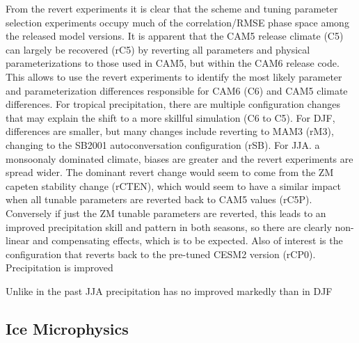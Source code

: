 From the revert experiments it is clear that the scheme and tuning parameter selection experiments occupy much of the correlation/RMSE phase space among the released model versions. It is apparent that the CAM5 release climate (C5) can largely be recovered (rC5) by reverting all parameters and physical parameterizations to those used in CAM5, but within the CAM6 release code. This allows to use the revert experiments to identify the most likely parameter and parameterization differences  responsible for CAM6 (C6) and CAM5 climate differences. For tropical precipitation, there are multiple configuration changes that may explain the shift to a more skillful simulation (C6 to C5). For DJF, differences are smaller, but many changes include reverting to MAM3 (rM3), changing to the SB2001 autoconversation configuration (rSB). For JJA. a monsoonaly dominated climate, biases are greater and the revert experiments are spread wider. The dominant revert change would seem to come from the ZM capeten stability change (rCTEN), which would seem to have a similar impact when all tunable parameters are reverted back to CAM5 values (rC5P). Conversely if just the ZM tunable parameters are reverted, this leads to an improved precipitation skill and pattern in both seasons, so there are clearly non-linear and compensating effects, which is to be expected. Also of interest is the configuration that reverts back to the pre-tuned CESM2 version (rCP0). Precipitation is improved



Unlike in the past JJA precipitation has no improved markedly than in DJF



\subsection{Ice Microphysics}

